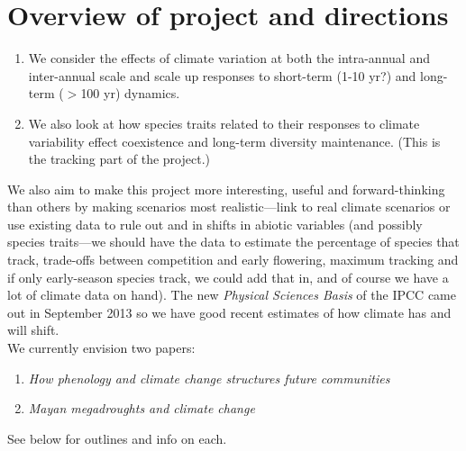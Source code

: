 \documentclass[11pt,a4paper,oneside]{article}
\begin{document}
\section{Overview of project and directions}
\noindent 
\begin{enumerate}
\item We consider the effects of climate variation at both the
intra-annual and inter-annual scale and scale up responses to
short-term (1-10 yr?) and long-term (\(>\)100 yr) dynamics. 
\item We also look at how species traits related to their responses to
  climate variability effect coexistence and long-term diversity
  maintenance. (This is the tracking part of the project.) 
\end{enumerate}

\noindent We also aim to make  this project more
interesting, useful and forward-thinking than others by making
scenarios most realistic---link to real climate scenarios or use
existing data to rule out and in shifts in abiotic variables (and
possibly species traits---we should have the data to estimate the
percentage of species that track, trade-offs between competition and early flowering, maximum tracking and if only
early-season species track, we could add that in, and of course we
have a lot of climate data on hand). The new \emph{Physical Sciences Basis} of the IPCC came out in September 2013 so we have good recent estimates of how climate has and will shift.\\

 We currently envision two papers: 
\begin{enumerate}
\item \emph{How phenology and climate change structures future communities}
\item \emph{Mayan megadroughts and climate change} 
\end{enumerate}
See below for outlines and info on each.
\newpage
\end{document}
